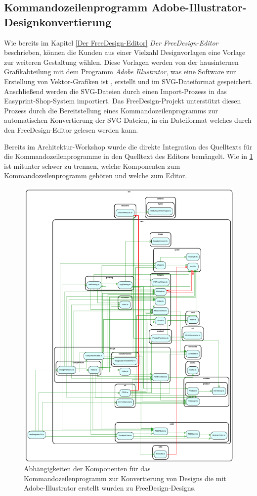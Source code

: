 \subsection{Kommandozeilenprogramm Adobe-Illustrator-Designkonvertierung}

Wie bereits im Kapitel \ref{Der FreeDesign-Editor} \emph{Der FreeDesign-Editor} beschrieben, können die Kunden aus einer Vielzahl Designvorlagen eine Vorlage zur weiteren Gestaltung wählen. 
Diese Vorlagen werden von der hausinternen Grafikabteilung mit dem Programm \emph{Adobe Illustrator}, was eine Software zur Erstellung von Vektor-Grafiken ist \autocite[vgl.][]{Adobe:Illustrator}, erstellt und im SVG-Dateiformat gespeichert. Anschließend werden die SVG-Dateien durch einen Import-Prozess in das Easyprint-Shop-System importiert. Das FreeDesign-Projekt unterstützt diesen Prozess durch die Bereitstellung eines Kommandozeilenprogramms zur automatischen Konvertierung der SVG-Dateien, in ein Dateiformat welches durch den FreeDesign-Editor gelesen werden kann.  

Bereits im Architektur-Workshop wurde die direkte Integration des Quelltexts für die Kommandozeilenprogramme in den Quelltext des Editors bemängelt. 
Wie in \ref{fig:DesignImport} ist mitunter schwer zu trennen, welche Komponenten zum Kommandozeilenprogramm gehören und welche zum Editor. 
\begin{figure}[H]
    \centering
    \includegraphics{diagrams/Ist-Architektur/draftImporter-analysis.pdf}
    \caption{Abhängigkeiten der Komponenten für das Kommandozeilenprogramm zur Konvertierung von Designs die mit Adobe-Illustrator erstellt wurden zu FreeDesign-Designs.}
    \label{fig:DesignImport}
\end{figure}


